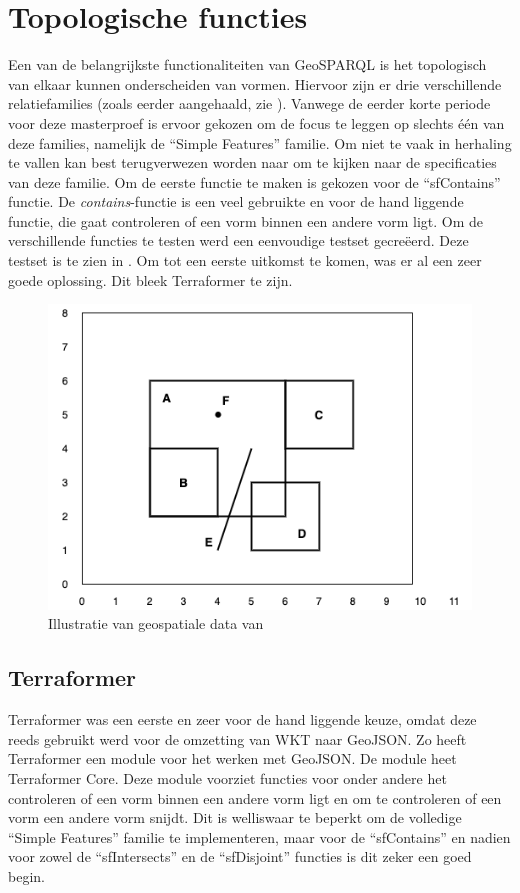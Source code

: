 \section{Topologische functies}
\label{sec:topologische_functies}
Een van de belangrijkste functionaliteiten van GeoSPARQL is het topologisch van elkaar kunnen onderscheiden van vormen. Hiervoor zijn er drie verschillende relatiefamilies (zoals eerder aangehaald, zie ). Vanwege de eerder korte periode voor deze masterproef is ervoor gekozen om de focus te leggen op slechts één van deze families, namelijk de ``Simple Features'' familie. Om niet te vaak in herhaling te vallen kan best terugverwezen worden naar  om te kijken naar de specificaties van deze familie. Om de eerste functie te maken is gekozen voor de ``sfContains'' functie. De \textit{contains}-functie is een veel gebruikte en voor de hand liggende functie, die gaat controleren of een vorm binnen een andere vorm ligt. Om de verschillende functies te testen werd een eenvoudige testset gecreëerd. Deze testset is te zien in . Om tot een eerste uitkomst te komen, was er al een zeer goede oplossing. Dit bleek Terraformer te zijn.

\begin{figure}[ht]
    \centering
    \includegraphics[width=0.5\linewidth]{images/geosparql_example.png}
    \caption{Illustratie van geospatiale data van \cite{ogcdocs}}
    \label{fig:illustration_spatial_data}
\end{figure}

\subsection{Terraformer}
Terraformer was een eerste en zeer voor de hand liggende keuze, omdat deze reeds gebruikt werd voor de omzetting van WKT naar GeoJSON. Zo heeft Terraformer een module voor het werken met GeoJSON. De module heet Terraformer Core. Deze module voorziet functies voor onder andere het controleren of een vorm binnen een andere vorm ligt en om te controleren of een vorm een andere vorm snijdt. Dit is welliswaar te beperkt om de volledige ``Simple Features'' familie te implementeren, maar voor de ``sfContains'' en nadien voor zowel de ``sfIntersects'' en de ``sfDisjoint'' functies is dit zeker een goed begin. 

